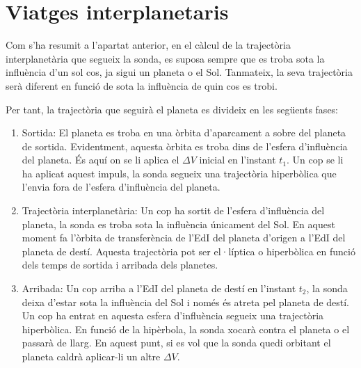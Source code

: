 \section{Viatges interplanetaris}
Com s'ha resumit a l'apartat anterior, en el càlcul de la trajectòria interplanetària que segueix la sonda, es suposa sempre que es troba sota la influència d'un sol cos, ja sigui un planeta o el Sol. Tanmateix, la seva trajectòria serà diferent en funció de sota la influència de quin cos es trobi.

Per tant, la trajectòria que seguirà el planeta es divideix en les següents fases:
\begin{enumerate}
	\item Sortida: El planeta es troba en una òrbita d'aparcament a sobre del planeta de sortida. Evidentment, aquesta òrbita es troba dins de l'esfera d'influència del planeta. És aquí on se li aplica el $\Delta V$ inicial en l'instant $t_{1}$. Un cop se li ha aplicat aquest impuls, la sonda segueix una trajectòria hiperbòlica que l'envia fora de l'esfera d'influència del planeta.
	\item Trajectòria interplanetària: Un cop ha sortit de l'esfera d'influència del planeta, la sonda es troba sota la influència únicament del Sol. En aquest moment fa l'òrbita de transferència de l'EdI del planeta d'origen a l'EdI del planeta de destí. Aquesta trajectòria pot ser el·líptica o hiperbòlica en funció dels temps de sortida i arribada dels planetes.
	\item Arribada: Un cop arriba a l'EdI del planeta de destí en l'instant $t_{2}$, la sonda deixa d'estar sota la influència del Sol i només és atreta pel planeta de destí. Un cop ha entrat en aquesta esfera d'influència segueix una trajectòria hiperbòlica. En funció de la hipèrbola, la sonda xocarà contra el planeta o el passarà de llarg. En aquest punt, si es vol que la sonda quedi orbitant el planeta caldrà aplicar-li un altre $\Delta V$.
\end{enumerate}